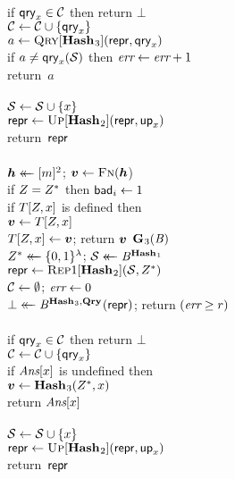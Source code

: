 \begin{figure}
{    \\[2pt]
      if $\mathsf{qry}_x \in \mathcal{C}$ then return $\bot$\\
      $\mathcal{C} \gets \mathcal{C} \cup \{\mathsf{qry}_x\}$\\
      $a \gets \textsc{Qry}[\mathbf{Hash}\hspace{0.5pt}_3](\mathsf{repr}, \mathsf{qry}_x)$\\
      if $a \neq \mathsf{qry}_x(\mathcal{S})$ then $\textit{err} \gets \textit{err} + 1$\\
      return~$a$
    \\[6pt]
    \\[2pt]
      $\mathcal{S} \gets \mathcal{S} \cup \{x\}$\\
      $\mathsf{repr} \gets \textsc{Up}[\mathbf{Hash}\hspace{0.5pt}_2](\mathsf{repr},\mathsf{up}_x)$\\
      return~$\mathsf{repr}$
    \\[6pt]
    \\[2pt]
      $\hh \getsr [m]^2$; $\vv \gets \fff(\hh$)\\
      if $Z = Z^*$ then $\mathsf{bad}_i \gets 1$\\
      if $T[Z,x]$ is defined then\\
      \tab $\vv \gets T[\salt,x]$\\
      $T[\salt,x] \gets \vv$;
      return $\vv$
  }
  {
    \underline{$\mathbf{G}\hspace{0.5pt}_3(\mathit{B})$}\\[2pt]
      $Z^* \mathrel{\leftarrow\mkern-14mu\leftarrow} \{0,1\}^\lambda$;
      $\mathcal{S} \mathrel{\leftarrow\mkern-14mu\leftarrow} \mathit{B}^{\mathbf{Hash}\hspace{0.5pt}_1}$\\
      $\mathsf{repr} \gets \textsc{Rep}1[\mathbf{Hash}\hspace{0.5pt}_2](\mathcal{S}, Z^*)$\\
      $\mathcal{C} \gets \emptyset$;
      $\textit{err} \gets 0$\\
      $\bot \mathrel{\leftarrow\mkern-14mu\leftarrow} \mathit{B}^{\mathbf{Hash}\hspace{0.5pt}_3,\mathbf{Qry}\hspace{0.5pt}}(\mathsf{repr})$;
      return $(\textit{err} \geq r)$
    \\[6pt]
    \\[2pt]
      if $\mathsf{qry}_x \in \mathcal{C}$ then return $\bot$\\
      $\mathcal{C} \gets \mathcal{C} \cup \{\mathsf{qry}_x\}$\\
      if $\textit{Ans}[x]$ is undefined then\\
      \tab $\vv \gets \HASHO_3(\salt^*,x)$\\
      return $\textit{Ans}[x]$
    \\[6pt]
    \\[2pt]
      $\mathcal{S} \gets \mathcal{S} \cup \{x\}$\\
      $\mathsf{repr} \gets \textsc{Up}[\mathbf{Hash}\hspace{0.5pt}_2](\mathsf{repr},\mathsf{up}_x)$\\
      return~$\mathsf{repr}$
  }
  {
    \\[2pt]
}
\end{figure}
